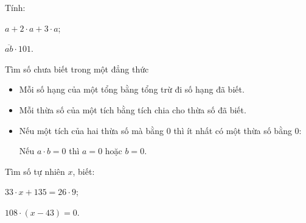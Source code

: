 \begin{vd}%
	Tính:
	\begin{enumEX}{2}
		\item $a + 2 \cdot a + 3 \cdot a$;
		\item $\overline{ab} \cdot 101$.		
	\end{enumEX}
\end{vd}

	\begin{dang}{Tìm số chưa biết trong một đẳng thức}
		\begin{itemize}
			\item Mỗi số hạng của một tổng bằng tổng trừ đi số hạng đã biết.
			\item Mỗi thừa số của một tích bằng tích chia cho thừa số đã biết.
			\item Nếu một tích của hai thừa số mà bằng $0$ thì ít nhất có một thừa số bằng $0$:\\
					\begin{center}
						Nếu $a \cdot b = 0$ thì $a = 0$ hoặc $b = 0$.
					\end{center}
		\end{itemize}
	\end{dang}
	
\begin{vd}%
	Tìm số tự nhiên $x$, biết:
	\begin{enumEX}{2}
		\item $33 \cdot x + 135 = 26 \cdot 9$;
		\item $108 \cdot (x - 43) = 0$.		
	\end{enumEX}
\end{vd}

